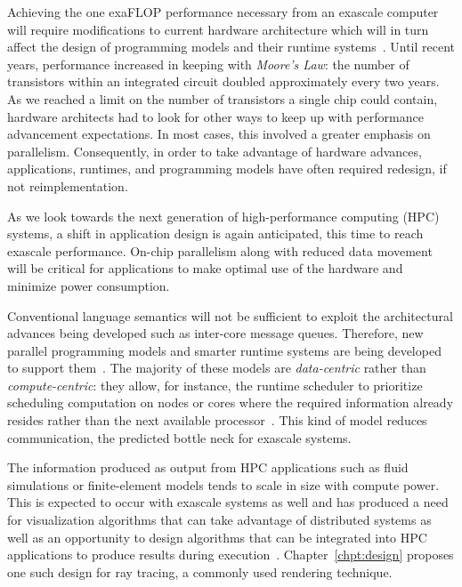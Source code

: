 \label{chpt:introduction}

Achieving the one exaFLOP performance necessary from an exascale computer will
require modifications to current hardware architecture which will in turn affect
the design of programming models and their runtime
systems~\cite{article-kogge}.  Until recent years, performance increased in
keeping with \emph{Moore's Law}: the number of transistors within an integrated
circuit doubled approximately every two years.  As we reached a limit on the
number of transistors a single chip could contain, hardware architects had to
look for other ways to keep up with performance advancement expectations. In
most cases, this involved a greater emphasis on parallelism. Consequently, in
order to take advantage of hardware advances, applications, runtimes, and
programming models have often required redesign, if not reimplementation.

As we look towards the next generation of high-performance computing
(HPC) systems, a shift in application design is again anticipated,
this time to reach exascale performance. On-chip parallelism along
with reduced data movement will be critical for applications to make
optimal use of the hardware and minimize power consumption.

Conventional language semantics will not be sufficient
to exploit the architectural advances being developed such as
inter-core message queues. Therefore, new parallel programming models
and smarter runtime systems are being developed to support
them~\cite{article-gottlieb}.  The majority of these models are
\emph{data-centric} rather than \emph{compute-centric}: they allow, for
instance, the runtime scheduler to prioritize scheduling computation on nodes
or cores where the required information already resides rather than the next
available processor~\cite{article-kogge}. This kind of model reduces
communication, the predicted bottle neck for exascale systems.

The information produced as output from HPC applications such as fluid
simulations or finite-element models tends to scale in size with
compute power. This is expected to occur with exascale systems as well
and has produced a need for visualization algorithms that can take
advantage of distributed systems as well as an opportunity to design
algorithms that can be integrated into HPC applications to produce
results during execution~\cite{proceedings-brownlee}.  Chapter~\ref{chpt:design}
proposes one such design for ray tracing, a commonly used rendering technique.

